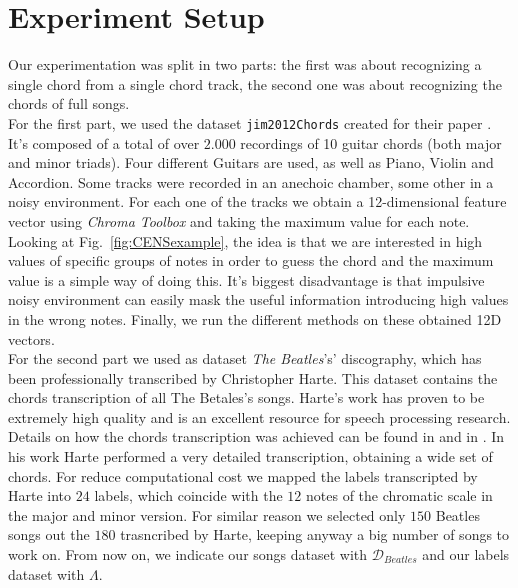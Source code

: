 \section{Experiment Setup}
\label{sec:setup}

Our experimentation was split in two parts: the first was about recognizing a single chord from a single chord track, the second one was about recognizing the chords of full songs.\\
%
For the first part, we used the dataset \texttt{jim2012Chords} \cite{jim2012Chords} created for their paper \cite{JimChordsPaper}. It's composed of a total of over $2.000$ recordings of 10 guitar chords (both major and minor triads). Four different Guitars are used, as well as Piano, Violin and Accordion. Some tracks were recorded in an anechoic chamber, some other in a noisy environment. For each one of the tracks we obtain a 12-dimensional feature vector using \textit{Chroma Toolbox} and taking the maximum value for each note. Looking at Fig.~\ref{fig:CENSexample}, the idea is that we are interested in high values of specific groups of notes in order to guess the chord and the maximum value is a simple way of doing this. It's biggest disadvantage is that impulsive noisy environment can easily mask the useful information introducing high values in the wrong notes. Finally, we run the different methods on these obtained 12D vectors.\\
%
For the second part we used as dataset \textit{The Beatles}'s' discography, which has been professionally transcribed by Christopher Harte. This dataset contains the chords transcription of all The Betales's songs. Harte's work has proven to be extremely high quality and is an excellent resource for speech processing research. Details on how the chords transcription was achieved can be found in \cite{HartePaper} and in \cite{HarteThesis}. In his work Harte performed a very detailed transcription, obtaining a wide set of chords. For reduce computational cost we mapped the labels transcripted by Harte into $24$ labels, which coincide with the $12$ notes of the chromatic scale in the major and minor version. For similar reason we selected only $150$ Beatles songs out the $180$ trasncribed by Harte, keeping anyway a big number of songs to work on. From now on, we indicate our songs dataset with $\mathcal{D}_{Beatles}$ and our labels dataset with $\Lambda$. \\
%
